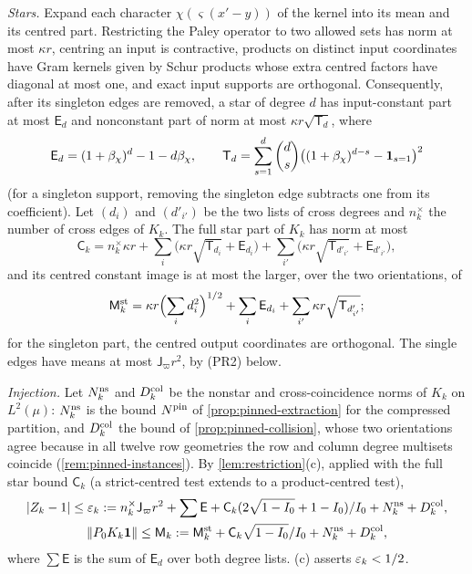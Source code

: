 \emph{Stars.} Expand each character $\chi(\varsigma(x'-y))$ of the kernel into its
mean and its centred part. Restricting the Paley operator to two allowed sets has
norm at most $\kappa r$, centring an input is contractive, products on distinct input
coordinates have Gram kernels given by Schur products whose extra centred factors
have diagonal at most one, and exact input supports are orthogonal. Consequently,
after its singleton edges are removed, a star of degree $d$ has input-constant part at
most $\mathsf E_d$ and nonconstant part of norm at most $\kappa r\sqrt{\mathsf T_d}$,
where
\[
 \mathsf E_d=(1+\beta_\chi)^d-1-d\beta_\chi,\qquad
 \mathsf T_d=\sum_{s=1}^d\binom ds\bigl((1+\beta_\chi)^{d-s}-\mathbf 1_{s=1}\bigr)^2
\]
(for a singleton support, removing the singleton edge subtracts one from its
coefficient). Let $(d_i)$ and $(d'_{i'})$ be the two lists of cross degrees and
$n^\times_k$ the number of cross edges of $K_k$. The full star part of $K_k$ has norm
at most
\[
 \mathsf C_k=n^\times_k\kappa r+\sum_i\bigl(\kappa r\sqrt{\mathsf T_{d_i}}+\mathsf E_{d_i}\bigr)
 +\sum_{i'}\bigl(\kappa r\sqrt{\mathsf T_{d'_{i'}}}+\mathsf E_{d'_{i'}}\bigr),
\]
and its centred constant image is at most the larger, over the two orientations, of
\[
 \mathsf M^{\rm st}_k=\kappa r\Bigl(\sum_id_i^2\Bigr)^{1/2}+\sum_i\mathsf E_{d_i}
 +\sum_{i'}\kappa r\sqrt{\mathsf T_{d'_{i'}}} ;
\]
for the singleton part, the centred output coordinates are orthogonal. The single
edges have means at most $\mathsf J_\varpi r^2$, by (PR2) below.

\emph{Injection.} Let $N^{\rm ns}_k$ and $D^{\rm col}_k$ be the nonstar and
cross-coincidence norms of $K_k$ on $L^2(\mu)$: $N^{\rm ns}_k$ is the bound
$N^{\rm pin}$ of \cref{prop:pinned-extraction} for the compressed partition, and
$D^{\rm col}_k$ the bound of \cref{prop:pinned-collision}, whose two orientations
agree because in all twelve row geometries the row and column degree multisets
coincide (\cref{rem:pinned-instances}). By \cref{lem:restriction}(c), applied with
the full star bound $\mathsf C_k$ (a strict-centred test extends to a
product-centred test),
\begin{gather*}
 |Z_k-1|\le\varepsilon_k:=n^\times_k\mathsf J_\varpi r^2+\sum\mathsf E
 +\mathsf C_k(2\sqrt{1-I_0}+1-I_0)/I_0+N^{\rm ns}_k+D^{\rm col}_k,\\
 \left\|P_0K_k\mathbf 1\right\|\le\mathsf M_k:=\mathsf M^{\rm st}_k+\mathsf C_k\sqrt{1-I_0}/I_0
 +N^{\rm ns}_k+D^{\rm col}_k,
\end{gather*}
where $\sum\mathsf E$ is the sum of $\mathsf E_d$ over both degree lists.
(c) asserts $\varepsilon_k<1/2$.

